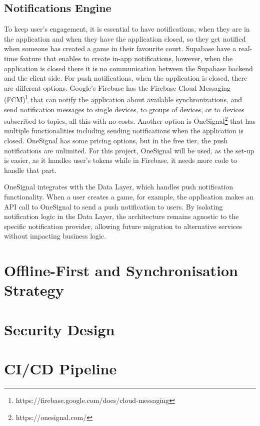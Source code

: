 \subsection{Notifications Engine}

To keep user's engagement, it is essential to have notifications, when they are in the application and when they have the application closed, so they get notified when someone has created a game in their favourite court. Supabase have a real-time feature that enables to create in-app notifications, however, when the application is closed there it is no communication between the Supabase backend and the client side. For push notifications, when the application is closed, there are different options. Google's Firebase has the Firebase Cloud Messaging (FCM)\footnote{https://firebase.google.com/docs/cloud-messaging} that can notify the application about available synchronizations, and send notification messages to single devices, to groups of devices, or to devices subscribed to topics, all this with no costs. Another option is OneSignal\footnote{https://onesignal.com/} that has multiple functionalities including sending notifications when the application is closed. OneSignal has some pricing options, but in the free tier, the push notifications are unlimited. For this project, OneSignal will be used, as the set-up is easier, as it handles user's tokens while in Firebase, it needs more code to handle that part.

OneSignal integrates with the Data Layer, which handles push notification functionality. When a user creates a game, for example, the application makes an API call to OneSignal to send a push notification to users. By isolating notification logic in the Data Layer, the architecture remains agnostic to the specific notification provider, allowing future migration to alternative services without impacting business logic.


\section{Offline-First and Synchronisation Strategy}
\label{sec:arch-offline}

\section{Security Design}
\label{sec:arch-security}

\section{CI/CD Pipeline}
\label{sec:arch-cicd}



